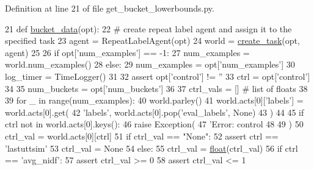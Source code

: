 Definition at line 21 of file get\+\_\+bucket\+\_\+lowerbounds.\+py.


\begin{DoxyCode}
21 \textcolor{keyword}{def }\hyperlink{namespaceprojects_1_1controllable__dialogue_1_1get__bucket__lowerbounds_aeba9a3a9932797d722c5ff9d0991a87e}{bucket\_data}(opt):
22     \textcolor{comment}{# create repeat label agent and assign it to the specified task}
23     agent = RepeatLabelAgent(opt)
24     world = \hyperlink{namespaceparlai_1_1core_1_1worlds_a79969c7ba76d4b3c500f5bb776444dc6}{create\_task}(opt, agent)
25 
26     \textcolor{keywordflow}{if} opt[\textcolor{stringliteral}{'num\_examples'}] == -1:
27         num\_examples = world.num\_examples()
28     \textcolor{keywordflow}{else}:
29         num\_examples = opt[\textcolor{stringliteral}{'num\_examples'}]
30     log\_timer = TimeLogger()
31 
32     \textcolor{keyword}{assert} opt[\textcolor{stringliteral}{'control'}] != \textcolor{stringliteral}{''}
33     ctrl = opt[\textcolor{stringliteral}{'control'}]
34 
35     num\_buckets = opt[\textcolor{stringliteral}{'num\_buckets'}]
36 
37     ctrl\_vals = []  \textcolor{comment}{# list of floats}
38 
39     \textcolor{keywordflow}{for} \_ \textcolor{keywordflow}{in} range(num\_examples):
40         world.parley()
41         world.acts[0][\textcolor{stringliteral}{'labels'}] = world.acts[0].get(
42             \textcolor{stringliteral}{'labels'}, world.acts[0].pop(\textcolor{stringliteral}{'eval\_labels'}, \textcolor{keywordtype}{None})
43         )
44 
45         \textcolor{keywordflow}{if} ctrl \textcolor{keywordflow}{not} \textcolor{keywordflow}{in} world.acts[0].keys():
46             \textcolor{keywordflow}{raise} Exception(
47                 \textcolor{stringliteral}{'Error: control %
48                 %
49             )
50         ctrl\_val = world.acts[0][ctrl]
51         \textcolor{keywordflow}{if} ctrl\_val == \textcolor{stringliteral}{"None"}:
52             \textcolor{keyword}{assert} ctrl == \textcolor{stringliteral}{'lastuttsim'}
53             ctrl\_val = \textcolor{keywordtype}{None}
54         \textcolor{keywordflow}{else}:
55             ctrl\_val = \hyperlink{namespaceprojects_1_1controllable__dialogue_1_1make__control__dataset_aa2b7207688c641dbc094ab44eca27113}{float}(ctrl\_val)
56         \textcolor{keywordflow}{if} ctrl == \textcolor{stringliteral}{'avg\_nidf'}:
57             \textcolor{keyword}{assert} ctrl\_val >= 0
58             \textcolor{keyword}{assert} ctrl\_val <= 1
}
\end{DoxyCode}
